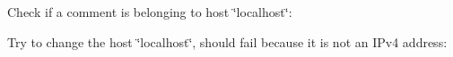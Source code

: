 \begin{DoxyCode}{0}
\end{DoxyCode}


Check if a comment is belonging to host \char`\"{}localhost\char`\"{}\+:


\begin{DoxyCode}{0}
\end{DoxyCode}


Try to change the host \char`\"{}localhost\char`\"{}, should fail because it is not an I\+Pv4 address\+:


\begin{DoxyCode}{0}
\end{DoxyCode}


